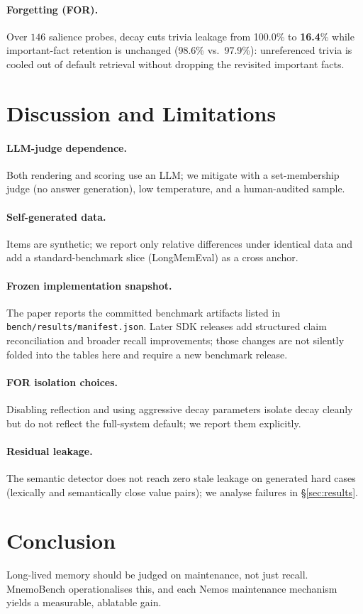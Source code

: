 \documentclass[11pt]{article}
\newcommand{\forTLdecay}{\textbf{16.4}}
\newcommand{\forTLnone}{100.0}
\newcommand{\forIFRdecay}{97.9}
\newcommand{\forIFRnone}{98.6}
\begin{document}
\paragraph{Forgetting (FOR).} Over $146$ salience probes, decay cuts trivia leakage from
\forTLnone{}\% to \forTLdecay{}\% while important-fact retention is unchanged
(\forIFRnone{}\% vs.\ \forIFRdecay{}\%): unreferenced trivia is cooled out of default
retrieval without dropping the revisited important facts.

\section{Discussion and Limitations}
\label{sec:limits}
\paragraph{LLM-judge dependence.} Both rendering and scoring use an LLM; we mitigate with a
set-membership judge (no answer generation), low temperature, and a human-audited sample.
\paragraph{Self-generated data.} Items are synthetic; we report only relative differences
under identical data and add a standard-benchmark slice (LongMemEval) as a cross anchor.

\paragraph{Frozen implementation snapshot.} The paper reports the committed benchmark
artifacts listed in \texttt{bench/results/manifest.json}. Later SDK releases add structured
claim reconciliation and broader recall improvements; those changes are not silently folded
into the tables here and require a new benchmark release.
\paragraph{FOR isolation choices.} Disabling reflection and using aggressive decay parameters
isolate decay cleanly but do not reflect the full-system default; we report them explicitly.
\paragraph{Residual leakage.} The semantic detector does not reach zero stale leakage on
generated hard cases (lexically and semantically close value pairs); we analyse failures in
\S\ref{sec:results}.

\section{Conclusion}
Long-lived memory should be judged on maintenance, not just recall. MnemoBench operationalises
this, and each Nemos maintenance mechanism yields a measurable, ablatable gain.



\end{document}
